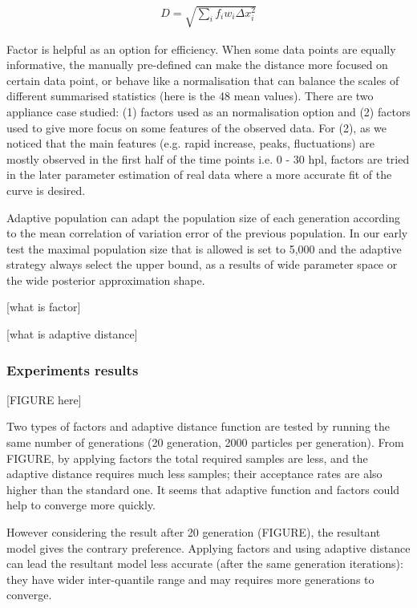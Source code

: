\begin{align}
    \label{dis_f}
    D=\sqrt{\sum_i f_iw_i \Delta x_i^2}
\end{align}

Factor is helpful as an option for efficiency. When some data points are equally informative, the manually pre-defined can make the distance more focused on certain data point, or behave like a normalisation that can balance the scales of different summarised statistics (here is the 48 mean values). There are two appliance case studied: (1) factors used as an normalisation option and (2) factors used to give more focus on some features of the observed data. For (2), as we noticed that the main features (e.g. rapid increase, peaks, fluctuations) are mostly observed in the first half of the time points i.e. 0 - 30 hpl, factors are tried in the later parameter estimation of real data where a more accurate fit of the curve is desired.

Adaptive population \cite{population} can adapt the population size of each generation according to the mean correlation of variation error of the previous population. In our early test the maximal population size that is allowed is set to 5,000 and the adaptive strategy always select the upper bound, as a results of wide parameter space or the wide posterior approximation shape.

    [what is factor]

    [what is adaptive distance]

\subsubsection{Experiments results}

[FIGURE here]

Two types of factors and adaptive distance function are tested by running the same number of generations (20 generation, 2000 particles per generation). From FIGURE, by applying factors the total required samples are less, and the adaptive distance requires much less samples; their acceptance rates are also higher than the standard one. It seems that adaptive function and factors could help to converge more quickly.

However considering the result after 20 generation (FIGURE), the resultant model gives the contrary preference. Applying factors and using adaptive distance can lead the resultant model less accurate (after the same generation iterations): they have wider inter-quantile range and may requires more generations to converge.


